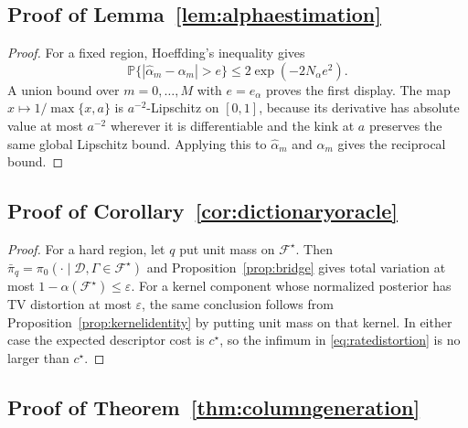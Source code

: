 \documentclass[twoside,11pt]{article}
\newcommand{\D}{\mathcal{D}}
\newcommand{\F}{\mathcal{F}}
\newcommand{\PP}{\mathbb{P}}
\begin{document}
\subsection{Proof of Lemma~\ref{lem:alphaestimation}}

\begin{proof} For a fixed region, Hoeffding's inequality gives
\[
\PP\{|\widehat\alpha_m-\alpha_m|>e\} \le 2\exp(-2N_\alpha e^2).
\]
A union bound over $m=0,\dots,M$ with $e=e_\alpha$ proves the first display. The map $x\mapsto1/\max\{x,a\}$ is $a^{-2}$-Lipschitz on $[0,1]$, because its derivative has absolute value at most $a^{-2}$ wherever it is differentiable and the kink at $a$ preserves the same global Lipschitz bound. Applying this to $\widehat\alpha_m$ and $\alpha_m$ gives the reciprocal bound.
\end{proof}

\subsection{Proof of Corollary~\ref{cor:dictionaryoracle}}

\begin{proof} For a hard region, let \(q\) put unit mass on \(\F^\star\). Then \(\bar\pi_q=\pi_0(\cdot\mid\D,\Gamma\in\F^\star)\) and Proposition~\ref{prop:bridge} gives total variation at most \(1-\alpha(\F^\star)\le\varepsilon\). For a kernel component whose normalized posterior has TV distortion at most \(\varepsilon\), the same conclusion follows from Proposition~\ref{prop:kernelidentity} by putting unit mass on that kernel. In either case the expected descriptor cost is \(c^\star\), so the infimum in \eqref{eq:ratedistortion} is no larger than \(c^\star\).
\end{proof}

\subsection{Proof of Theorem~\ref{thm:columngeneration}}
\end{document}
